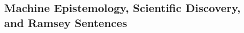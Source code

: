 \documentclass[11pt, oneside]{article}   	%
\begin{document}














\subsection{Machine Epistemology, Scientific Discovery, and Ramsey Sentences}


\end{document}
